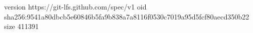 version https://git-lfs.github.com/spec/v1
oid sha256:9541a80dbcb5e60846b5fa9b838a7a8116f0530c7019a95d5fcf80aecd350b22
size 411391
